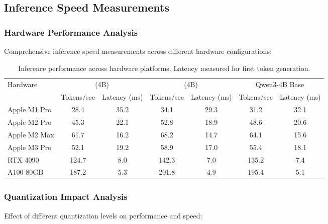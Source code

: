 \begin{table}[H]
\begin{table}[H]
\begin{table}[H]
\begin{table}[H]
\subsection{Inference Speed Measurements}

\subsubsection{Hardware Performance Analysis}

Comprehensive inference speed measurements across different hardware configurations:

\begin{table}[H]
\centering
\begin{tabular}{lcccccc}
\toprule
\multirow{2}{*}{Hardware} & \multicolumn{2}{c}{\supra{} (4B)} & \multicolumn{2}{c}{\zennano{} (4B)} & \multicolumn{2}{c}{Qwen3-4B Base} \\
\cmidrule(lr){2-3} \cmidrule(lr){4-5} \cmidrule(lr){6-7}
& Tokens/sec & Latency (ms) & Tokens/sec & Latency (ms) & Tokens/sec & Latency (ms) \\
\midrule
Apple M1 Pro & 28.4 & 35.2 & 34.1 & 29.3 & 31.2 & 32.1 \\
Apple M2 Pro & 45.3 & 22.1 & 52.8 & 18.9 & 48.6 & 20.6 \\
Apple M2 Max & 61.7 & 16.2 & 68.2 & 14.7 & 64.1 & 15.6 \\
Apple M3 Pro & 52.1 & 19.2 & 58.9 & 17.0 & 55.4 & 18.1 \\
RTX 4090 & 124.7 & 8.0 & 142.3 & 7.0 & 135.2 & 7.4 \\
A100 80GB & 187.2 & 5.3 & 201.8 & 4.9 & 195.4 & 5.1 \\
\bottomrule
\end{tabular}
\caption{Inference performance across hardware platforms. Latency measured for first token generation.}
\label{tab:hardware-performance}
\end{table}

\subsubsection{Quantization Impact Analysis}

Effect of different quantization levels on performance and speed:


\end{table}
\end{table}
\end{table}
\end{table}
